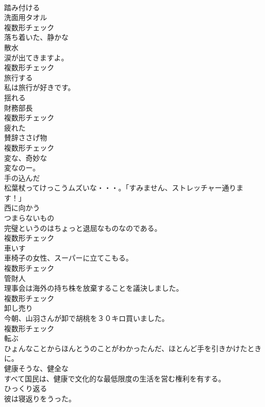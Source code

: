 \documentclass[8pt]{extreport}
\begin{document}
\begin{CJK}{UTF8}{min}
\\	[動詞]	踏み付ける	
\\	[名詞]	洗面用タオル	
\\	複数形チェック
\\	[形容詞]	落ち着いた、静かな	
\\	[名詞]	散水	
\\	涙が出てきますよ。	
\\	複数形チェック
\\	[形容詞]	旅行する	
\\	私は旅行が好きです。	
\\	[動詞]	揺れる	
\\	[名詞]	財務部⻑	
\\	複数形チェック
\\	[形容詞]	疲れた	
\\	[名詞]	賛辞ささげ物	
\\	複数形チェック
\\	[形容詞]	変な、奇妙な	
\\	変なのー。	
\\	[形容詞]	手の込んだ	
\\	松葉杖ってけっこうムズいな・・・。「すみません、ストレッチャー通ります！」	
\\	[形容詞]	⻄に向かう	
\\	[名詞]	つまらないもの	
\\	完璧というのはちょっと退屈なものなのである。	
\\	複数形チェック
\\	[名詞]	車いす	
\\	車椅子の女性、スーパーに立てこもる。	
\\	複数形チェック
\\	[名詞]	管財人	
\\	理事会は海外の持ち株を放棄することを議決しました。	
\\	複数形チェック
\\	[名詞]	卸し売り	
\\	今朝、山羽さんが卸で胡桃を３０キロ買いました。	
\\	複数形チェック
\\	[動詞]	転ぶ	
\\	ひょんなことからほんとうのことがわかったんだ、ほとんど手を引きかけたときに。	
\\	[形容詞]	健康そうな、健全な	
\\	すべて国民は、健康で文化的な最低限度の生活を営む権利を有する。	
\\	[動詞]	ひっくり返る	
\\	彼は寝返りをうった。	

\end{CJK}
\end{document}
